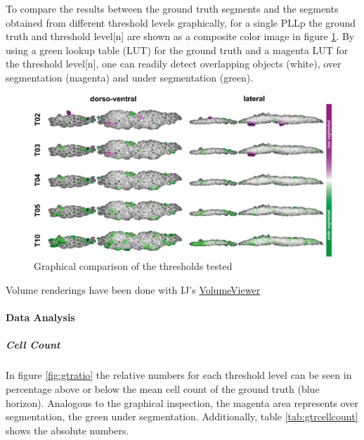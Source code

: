 \documentclass[11pt,singlespacinge,twoside]{reedthesis} %
\begin{document}
To compare the results between the ground truth segments and the segments obtained from different threshold levels graphically, for a single PLLp the ground truth and threshold level{[}n{]} are shown as a composite color image in figure \ref{fig:stackcomp}. By using a green lookup table (LUT) for the ground truth and a magenta LUT for the threshold level{[}n{]}, one can readily detect overlapping objects (white), over segmentation (magenta) and under segmentation (green).


\begin{figure}

{\centering \includegraphics[width=0.85\linewidth]{figures/materials/ground_truth/volumes} 

}

\caption{Graphical comparison of the thresholds tested}\label{fig:stackcomp}
\end{figure}
\noindent Volume renderings have been done with IJ's \href{\%22https://github.com/fiji/Volume_Viewer/releases/tag/Volume_Viewer-2.01.2\%22}{VolumeViewer}

\hypertarget{data-analysis-1}{%
\paragraph{Data Analysis}\label{data-analysis-1}}

\hypertarget{cell-count}{%
\subparagraph{Cell Count}\label{cell-count}}

In figure \ref{fig:gtratio} the relative numbers for each threshold level can be seen in percentage above or below the mean cell count of the ground truth (blue horizon). Analogous to the graphical inspection, the magenta area represents over segmentation, the green under segmentation. Additionally, table \ref{tab:gtrcellcount} shows the absolute numbers.
\end{document}
